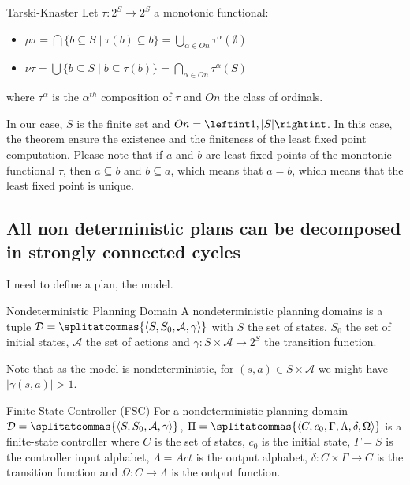 \begin{namedtheo}{Tarski-Knaster}\label{th:tarski}
Let $\tau:2^S \rightarrow 2^S$ a monotonic functional:
\begin{itemize}
\item $\mu \tau = \bigcap \{b \subseteq S \mid \tau(b) \subseteq b\} = \bigcup_{\alpha \in On} \tau^{\alpha}(\emptyset)$
\item $\nu \tau = \bigcup \{b \subseteq S \mid b \subseteq \tau(b) \} = \bigcap_{\alpha \in On} \tau^{\alpha}(S)$
\end{itemize}
where $\tau^{\alpha}$ is the $\alpha^{th}$ composition of $\tau$ and $On$ the class of ordinals.
\end{namedtheo}
In our case, $S$ is the finite set and $On = \leftint 1,|S|\rightint$. 
In this case, the theorem ensure the existence and the finiteness of the least fixed point computation.
Please note that if $a$ and $b$ are least fixed points of the monotonic functional $\tau$, then $a \subseteq b$ and $b \subseteq a$, which means that $a=b$, which means that the least fixed point is unique.

\subsection{All non deterministic plans can be decomposed in strongly connected cycles}

\newcommand{\planningdomain}{\ensuremath{ \splitatcommas{\langle S, S_0, \mathcal{A}, \gamma \rangle} }}

\newcommand{\controller}{\ensuremath{\splitatcommas{ \langle C, c_0, \Gamma, \Lambda, \delta, \Omega \rangle}}}

\newcommand{\planningproblem}{\ensuremath{\splitatcommas{ \langle \mathcal{D}, G \rangle}}}
I need to define a plan, the model.

\begin{nameddef}{Nondeterministic Planning Domain}
A nondeterministic planning domains is a tuple 
$\mathcal{D} = \planningdomain$
with
$S$ the set of states,
$S_0$ the set of initial states,
$\mathcal{A}$ the set of actions and
$\gamma : S \times \mathcal{A} \rightarrow 2^S$ the transition function.
\end{nameddef}

Note that as the model is nondeterministic, for $(s,a) \in S \times \mathcal{A}$ we might have $|\gamma(s,a)|>1$.

\begin{nameddef}{Finite-State Controller (FSC)}
For a nondeterministic planning domain
$\mathcal{D} = \planningdomain$,
$\Pi = \controller$ is a finite-state controller where
$C$ is the set of states,
$c_0$ is the initial state,
$\Gamma = S$ is the controller input alphabet,
$\Lambda = Act$ is the output alphabet,
$\delta: C \times \Gamma \rightarrow C$ is the transition function and 
$\Omega: C \rightarrow \Lambda$ is the output function.
\end{nameddef}

